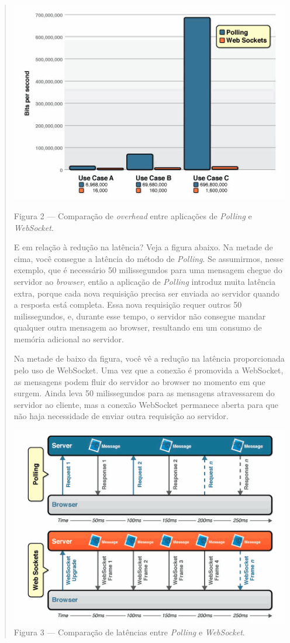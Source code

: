 \documentclass[a4paper,12pt]{article}
\begin{document}
\begin{quotation}
\includegraphics[width=1\linewidth]{images/comp.png}

Figura 2 — Comparação de \emph{overhead} entre aplicações de \emph{Polling} e \emph{WebSocket}.

E em relação à redução na latência? Veja a figura abaixo. Na metade de cima, você consegue a latência do método de \emph{Polling}. Se assumirmos, nesse exemplo, que é necessário 50 milissegundos para uma mensagem chegue do servidor ao \emph{browser}, então a aplicação de \emph{Polling} introduz muita latência extra, porque cada nova requisição precisa ser enviada ao servidor quando a resposta está completa. Essa nova requisição requer outros 50 milissegundos, e, durante esse tempo, o servidor não consegue mandar qualquer outra mensagem ao browser, resultando em um consumo de memória adicional ao servidor.

Na metade de baixo da figura, você vê a redução na latência proporcionada pelo uso de WebSocket. Uma vez que a conexão é promovida a WebSocket, as mensagens podem fluir do servidor ao browser no momento em que surgem. Ainda leva 50 milissegundos para as mensagens atravessarem do servidor ao cliente, mas a conexão WebSocket permanece aberta para que não haja necessidade de enviar outra requisição ao servidor.


\includegraphics[width=1\linewidth]{images/latency.png}
Figura 3 — Comparação de latências entre \emph{Polling} e \emph{WebSocket}.
\end{quotation}
\end{document}

